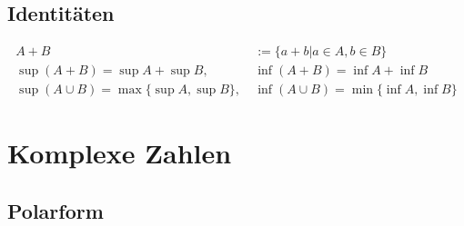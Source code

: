 \documentclass[11pt]{article}
\begin{document}
\subsection{Identit{\"a}ten}

\begin{equation*}
\begin{split}
	A + B & := \{a + b | a \in A, b \in B\} \\
	\sup(A+B) = \sup A + \sup B,\ & \inf(A+B) = \inf A + \inf B \\
	\sup(A \cup B) = \max\{\sup A, \sup B\},\ & \inf(A \cup B) = \min\{\inf A, \inf B\}
\end{split}
\end{equation*}

\section{Komplexe Zahlen}

\subsection{Polarform}
\end{document}
